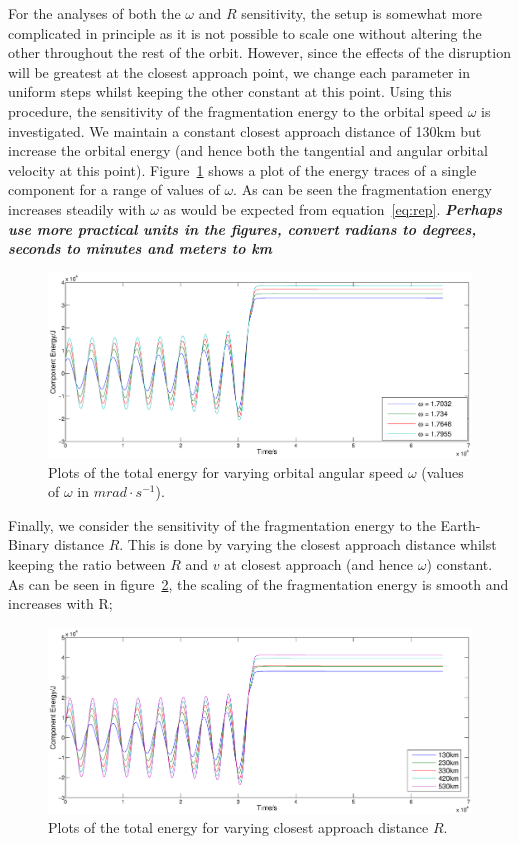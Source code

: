\documentclass[letterpaper, preprint, paper,11pt]{AAS}	%
\begin{document}
For the analyses of both the $\omega$ and $R$ sensitivity, the setup is somewhat more complicated in principle as it is not possible to scale one without altering the other throughout the rest of the orbit. However, since the effects of the disruption will be greatest at the closest approach point, we change each parameter in uniform steps whilst keeping the other constant at this point. 
Using this procedure, the sensitivity of the fragmentation energy to the orbital speed $\omega$ is investigated. We maintain a constant closest approach distance of 130km but increase the orbital energy (and hence both the tangential and angular orbital velocity at this point). Figure~\ref{fig:omegasens} shows a plot of the energy traces of a single component for a range of values of $\omega$. As can be seen the fragmentation energy increases steadily with $\omega$ as would be expected from equation~\ref{eq:rep}. \textbf{\emph{Perhaps use more practical units in the figures, convert radians to degrees, seconds to minutes and meters to km}}
\begin{figure}[H]
\centering
\centerline{\includegraphics[width=1.2\textwidth]{omegasens.eps}} 
\caption{Plots of the total energy for varying orbital angular speed $\omega$ (values of $\omega$ in $mrad\cdot s^{-1}$).} 
\label{fig:omegasens}
\end{figure} 


Finally, we consider the sensitivity of the fragmentation energy to the Earth-Binary distance $R$. This is done by varying the closest approach distance whilst keeping the ratio between $R$ and $v$ at closest approach (and hence $\omega$) constant. As can be seen in figure~\ref{fig:Rsens}, the scaling of the fragmentation energy is smooth and increases with R;
\begin{figure}[H]
\centering
\centerline{\includegraphics[width=1.2\textwidth]{Rsens.eps}} 
\caption{Plots of the total energy for varying closest approach distance $R$.} 
\label{fig:Rsens}
\end{figure} 
\end{document}
